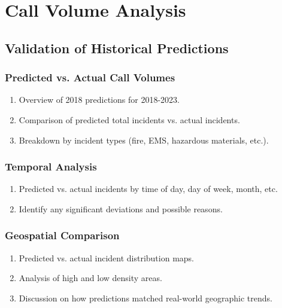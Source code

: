 \chapter{Call Volume Analysis}
\label{chap:call_vol_analysis}

\section{Validation of Historical Predictions}

\subsection{Predicted vs. Actual Call Volumes}
\begin{enumerate}
    \item Overview of 2018 predictions for 2018-2023.
    \item Comparison of predicted total incidents vs. actual incidents.
    \item Breakdown by incident types (fire, EMS, hazardous materials, etc.).
\end{enumerate}

\subsection{Temporal Analysis}
\begin{enumerate}
    \item Predicted vs. actual incidents by time of day, day of week, month, etc.
    \item Identify any significant deviations and possible reasons.
\end{enumerate}

\subsection{Geospatial Comparison}
\begin{enumerate}
    \item Predicted vs. actual incident distribution maps.
    \item Analysis of high and low density areas.
    \item Discussion on how predictions matched real-world geographic trends.
\end{enumerate}

